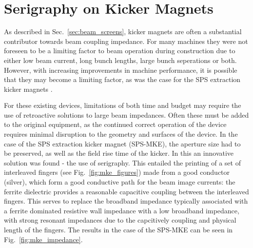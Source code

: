 \section{Serigraphy on Kicker Magnets}
\label{sec:seriagraphy}

As described in Sec.~\ref{sec:beam_screens}, kicker magnets are often a substantial contributor towards beam coupling impedance. For many machines they were not foreseen to be a limiting factor to beam operation during construction due to either low beam current, long bunch lengths, large bunch seperations or both. However, with increasing improvements in machine performance, it is possible that they may become a limiting factor, as was the case for the SPS extraction kicker magnets \cite{Kroyer:MKEReduct}. 

For these existing devices, limitations of both time and budget may require the use of retroactive solutions to large beam impedances. Often these must be added to the original equipment, as the continued correct operation of the device requires minimal disruption to the geometry and surfaces of the device. In the case of the SPS extraction kicker magnet (SPS-MKE), the aperture size had to be preserved, as well as the field rise time of the kicker. In this an innovative solution was found - the use of serigraphy. This entailed the printing of a set of interleaved fingers (see Fig.~\ref{fig:mke_figures}) made from a good conductor (silver), which form a good conductive path for the beam image currents: the ferrite dielectric provides a reasonable capacitive coupling between the interleaved fingers. This serves to replace the broadband impedance typically associated with a ferrite dominated resistive wall impedance with a low broadband impedance, with strong resonant impedances due to the capcitively coupling and physical length of the fingers. The results in the case of the SPS-MKE can be seen in Fig.~\ref{fig:mke_impedance}.



